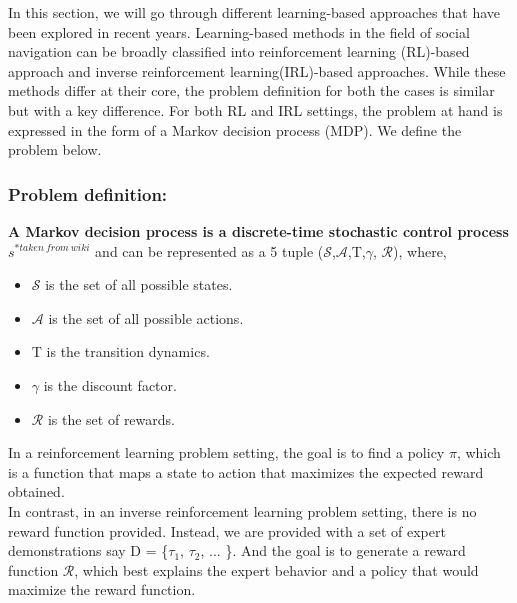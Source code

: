 \label{ch:3}
In this section, we will go through different learning-based approaches that have been explored in recent years. Learning-based methods in the field of social navigation can be broadly classified into reinforcement learning (RL)-based approach and inverse reinforcement learning(IRL)-based approaches. While these methods differ at their core, the problem definition for both the cases is similar but with a key difference. For both RL and IRL settings, the problem at hand is expressed in the form of a Markov decision process (MDP). We define the problem below.
\subsubsection*{Problem definition:}
\textbf{A Markov decision process is a discrete-time stochastic control process $s^{*taken\ from\ wiki}$} and can be represented as a 5 tuple
($\mathcal{S}$,$\mathcal{A}$,T,$\gamma$, $\mathcal{R}$), where,
\begin{itemize}
    \item $\mathcal{S}$ is the set of all possible states.
    \item $\mathcal{A}$ is the set of all possible actions.
    \item T is the transition dynamics.
    \item $\gamma$ is the discount factor.
    \item $\mathcal{R}$ is the set of rewards.
\end{itemize}  
In a reinforcement learning problem setting, the goal is to find a policy $\pi$, which is a function that maps a state to action that maximizes the expected reward obtained.\\
In contrast, in an inverse reinforcement learning problem setting, there is no reward function provided. Instead, we are provided with a set of expert demonstrations say D = \{$\tau_1$, $\tau_2$, ... \}. And the goal is to generate a reward function $\mathcal{R}$, which best explains the expert behavior and a policy that would maximize the reward function.


